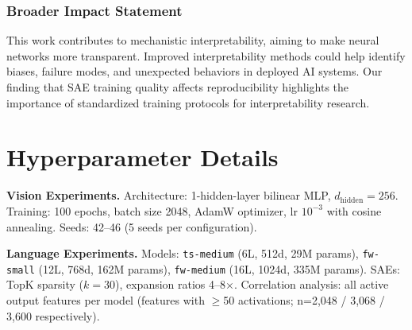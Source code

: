 \documentclass[10pt]{article}
\begin{document}








\subsubsection*{Broader Impact Statement}
This work contributes to mechanistic interpretability, aiming to make neural networks more transparent.
Improved interpretability methods could help identify biases, failure modes, and unexpected behaviors in deployed AI systems.
Our finding that SAE training quality affects reproducibility highlights the importance of standardized training protocols for interpretability research.




\appendix

\section{Hyperparameter Details}
\label{app:hyperparams}

\textbf{Vision Experiments.}
Architecture: 1-hidden-layer bilinear MLP, $d_{\text{hidden}} = 256$.
Training: 100 epochs, batch size 2048, AdamW optimizer, lr $10^{-3}$ with cosine annealing.
Seeds: 42--46 (5 seeds per configuration).

\textbf{Language Experiments.}
Models: \texttt{ts-medium} (6L, 512d, 29M params), \texttt{fw-small} (12L, 768d, 162M params), \texttt{fw-medium} (16L, 1024d, 335M params).
SAEs: TopK sparsity ($k=30$), expansion ratios 4--8$\times$.
Correlation analysis: all active output features per model (features with $\geq$50 activations; n=2,048 / 3,068 / 3,600 respectively).




\end{document}
